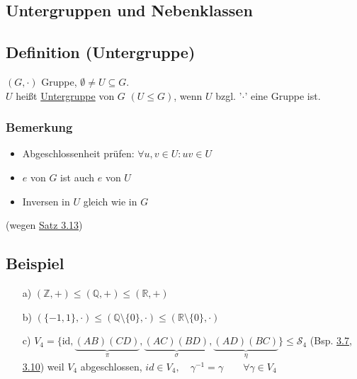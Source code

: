 \documentclass[a4paper, 12pt,titlepage, pdf, headsepline]{article}
\newcommand{\R}{\mathds{R}}
\newcommand{\uline}[1]{\underline{#1}}
\newcommand{\id}{\textrm{id}}
\renewcommand{\>}{\rightarrow}
\renewcommand{\*}{\cdot}
\begin{document}
	      \subsection*{Untergruppen und Nebenklassen}
	      \subsection{Definition (Untergruppe)}
	      $(G, \cdot)$ Gruppe, $\emptyset \neq U \subseteq G$.\\
	      $U$ heißt \uline{Untergruppe} von $G$ $(U \leq G)$, wenn $U$ bzgl. '$\cdot$' eine Gruppe ist.
	      	
	      \subsubsection*{Bemerkung}
	      \begin{itemize}
	      	\item Abgeschlossenheit prüfen: $\forall u,v  \in U: uv \in U$
	      	\item $e$ von $G$ ist auch $e$ von $U$
	      	\item Inversen in $U$ gleich wie in $G$
	      \end{itemize}
	      (wegen \hyperref[3.13]{Satz 3.13})
	      \subsection{Beispiel}
	      \label{3.16}
	      \begin{itemize}
	      	\item[a)] $(\mathds{Z}, +) \leq (\mathds{Q}, + ) \leq (\R, + )$
	      	\item[b)] $(\{-1,1\}, \cdot) \leq (\mathds{Q}\setminus \{0\}, \cdot) \leq (\R \setminus\{0\}, \cdot)$
	      	\item[c)] $V_4 = \{\id,\underbrace{(AB)(CD)}_{\pi},\underbrace{(AC)(BD)}_{\sigma}, \underbrace{(AD)(BC)}_{\eta}\} \leq \mathscr{S}_4$ (Bsp. \hyperref[3.7]{3.7}, \hyperref[3.10]{3.10}) weil $V_4$ abgeschlossen, $id \in V_4,\quad \gamma^{-1} = \gamma \qquad \forall \gamma \in V_4$
	      \end{itemize}
\end{document}
